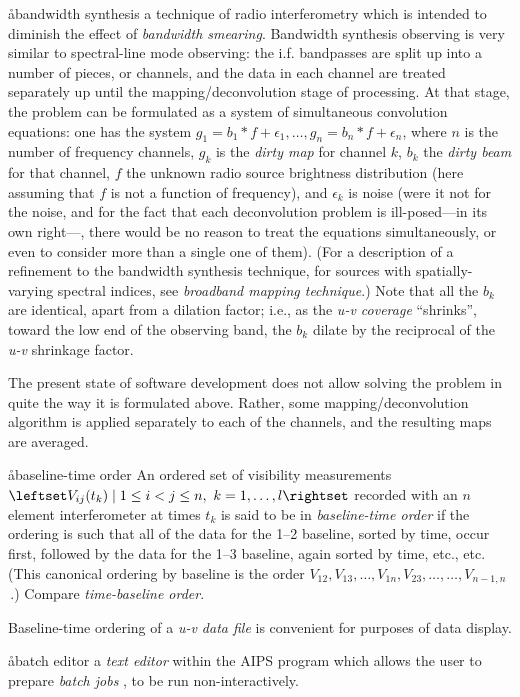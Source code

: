 \aa{bandwidth synthesis}
a technique of radio interferometry which is intended to diminish
the effect of {\it bandwidth smearing}.
Bandwidth synthesis observing is very similar to spectral-line mode
observing: the i.f. bandpasses are split up into a number of pieces,
or channels, and the data in each channel are treated separately
up until the mapping\slash deconvolution stage of processing.
At that stage, the problem can be formulated as a system of simultaneous
convolution equations: one has the system
$g_1=b_1\ast f+\epsilon_1,\dots,g_n=b_n\ast f+\epsilon_n$,
where $n$ is the number of frequency channels,
$g_k$ is the {\it dirty map} for channel $k$,
$b_k$ the {\it dirty beam} for that channel,
$f$ the unknown radio source brightness distribution (here assuming
that $f$ is not a function of frequency),
and $\epsilon_k$ is noise (were it not for the noise, and for the fact
that each deconvolution problem is ill-posed---in its own right---,
there would be no reason to treat the equations simultaneously,
or even to consider more than a single one of them).
(For a description of a refinement to the bandwidth synthesis technique,
for sources with spatially-varying spectral indices,
see {\it broadband mapping technique}.)
Note that all the $b_k$ are identical, apart from a
dilation factor; i.e., as the {\it u-v coverage} ``shrinks'', toward
the low end of the observing band, the $b_k$ dilate by the
reciprocal of the {\it u-v} shrinkage factor.
\par
The present state of software development does not allow solving the
problem in quite the way it is formulated above.
Rather, some mapping\slash deconvolution algorithm
is applied separately to each
of the channels, and the resulting maps are averaged.

\aa{baseline-time order}
An ordered set of visibility measurements
$\leftset V_{ij}(t_k)\mid 1\le i<j\le n,{\rm\ }k=1,\dots,l \rightset$
re\-cord\-ed with an $n$ element interferometer at times $t_k$
is said to be in {\it baseline-time order}
if the ordering is such that
all of the data for the 1--2 baseline, sorted by time,
occur first, followed by the data for the 1--3 baseline, again
sorted by time, etc., etc.
(This canonical ordering by baseline is the order
$V_{12},V_{13},\dots,V_{1n},V_{23},\dots,\dots,V_{n-1,n}$\,.)
Compare {\it time-baseline order}.
\par
Baseline-time ordering of a {\it u-v data file} is convenient for
purposes of data display.

\aa{batch editor}
a {\it text editor} within the AIPS program
which allows the user to prepare {\it batch jobs} \qv,
to be run non-interactively.

